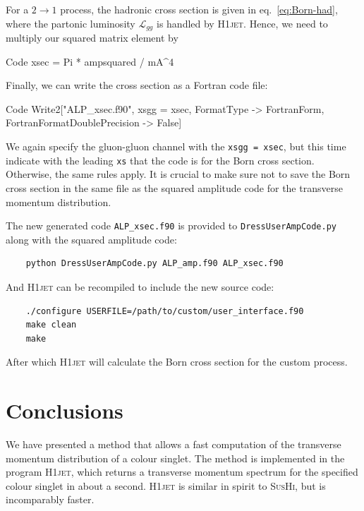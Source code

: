 \documentclass[12pt]{article}
\begin{document}
For a $2 \rightarrow 1$ process, the hadronic cross section is given in eq.~\eqref{eq:Born-had}, where the partonic luminosity $\mathcal{L}_{gg}$ is handled by \textsc{H1jet}. Hence, we need to multiply our squared matrix element by
\begin{mmaCell}{Code}
xsec = Pi * ampsquared / mA^4 
\end{mmaCell}
Finally, we can write the cross section as a Fortran code file: 
\begin{mmaCell}{Code}
Write2["ALP_xsec.f90", xsgg = xsec, FormatType -> FortranForm, FortranFormatDoublePrecision -> False] 
\end{mmaCell}
We again specify the gluon-gluon channel with the \texttt{xsgg = xsec}, but this time indicate with the leading \texttt{xs} that the code is for the Born cross section. Otherwise, the same rules apply. It is crucial to make sure not to save the Born cross section in the same file as the squared amplitude code for the transverse momentum distribution. 

The new generated code \texttt{ALP\_xsec.f90} is provided to \texttt{DressUserAmpCode.py} along with the squared amplitude code: 
\begin{lstlisting}
	python DressUserAmpCode.py ALP_amp.f90 ALP_xsec.f90 
\end{lstlisting}
And \textsc{H1jet} can be recompiled to include the new source code: 
\begin{lstlisting}
	./configure USERFILE=/path/to/custom/user_interface.f90 
	make clean
	make 
\end{lstlisting}
After which \textsc{H1jet} will calculate the Born cross section for the custom process. 

\section{Conclusions}
\label{sec:the-end}

We have presented a method that allows a fast computation of the
transverse momentum distribution of a colour singlet. The method is
implemented in the program \textsc{H1jet}, which returns a transverse momentum
spectrum for the specified colour singlet in about a second. \textsc{H1jet} is
similar in spirit to \textsc{SusHi}, but is incomparably faster.
\end{document}
